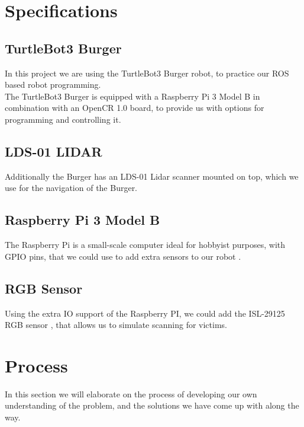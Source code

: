 \documentclass[conference]{IEEEtran}
\begin{document}
\section{Specifications}\label{specs}
\subsection{TurtleBot3 Burger}
In this project we are using the TurtleBot3 Burger robot, to practice our ROS based robot programming.\\
The TurtleBot3 Burger is equipped with a Raspberry Pi 3 Model B \cite{b1} in combination with an OpenCR 1.0 board, to 
provide us with options for programming and controlling it. \\

\subsection{LDS-01 LIDAR}
Additionally the Burger has an LDS-01\cite{b2} Lidar scanner mounted on top, which we use for the navigation of the Burger.\\

\subsection{Raspberry Pi 3 Model B}
The Raspberry Pi is a small-scale computer ideal for hobbyist purposes, with GPIO pins, that we could use to add extra sensors to
our robot \cite{b3}.\\

\subsection{RGB Sensor}
Using the extra IO support of the Raspberry PI, we could add the ISL-29125 RGB sensor \cite{b4}, that allows us to simulate scanning for
victims.\\

\section{Process}\label{process}
In this section we will elaborate on the process of developing our own understanding of the problem, and the solutions we have 
come up with along the way.\\
\end{document}
